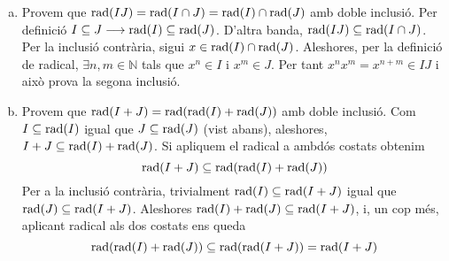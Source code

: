 \documentclass[../main.tex]{subfiles}
\begin{document}
\begin{sol}
\begin{enumerate}[(a)]
    \item Provem que $\rad(IJ)=\rad(I\cap J)=\rad(I)\cap \rad(J)$ amb doble inclusió. Per definició $I\subseteq J\longrightarrow \rad(I)\subseteq \rad(J)$. D'altra banda, $\rad(IJ)\subseteq \rad(I\cap J)$. Per la inclusió contrària, sigui $x\in \rad(I)\cap \rad(J)$. Aleshores, per la definició de radical, $\exists n,m\in \mathbb{N}$ tals que $x^n\in I$ i $x^m\in J$. Per tant $x^nx^m=x^{n+m}\in IJ$ i això prova la segona inclusió.
    
    \item Provem que $\rad(I+J)=\rad(\rad(I)+\rad(J))$ amb doble inclusió. Com $I\subseteq \rad(I)$ igual que $J\subseteq \rad(J)$ (vist abans), aleshores, $I+J \subseteq \rad(I)+\rad(J)$. Si apliquem el radical a ambdós costats obtenim
        \begin{equation}
            \notag
            \rad(I+J)\subseteq \rad(\rad(I)+\rad(J))
        \end{equation}
        Per a la inclusió contrària, trivialment $\rad(I) \subseteq \rad(I+J)$ igual que $\rad(J)\subseteq \rad(I+J)$. Aleshores $\rad(I)+\rad(J) \subseteq \rad(I+J)$, i, un cop més, aplicant radical als dos costats ens queda
        \begin{equation}
            \notag
            \rad(\rad(I)+\rad(J))\subseteq \rad(\rad(I+J))=\rad(I+J)
        \end{equation}
\end{enumerate}
\end{sol}
\end{document}
